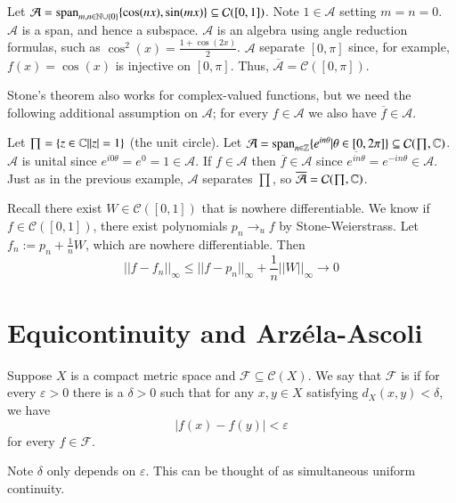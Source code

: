 \begin{example}
    Let $\mathcal{A} = \text{span}_{m,n\in\mathbb N\cup\{0\}}\{\cos(nx),\sin(mx)\} \subseteq \mathcal{C}([0,1])$. Note $1 \in \mathcal{A}$ setting $m = n= 0$. $\mathcal{A}$ is a span, and hence a subspace. $\mathcal{A}$ is an algebra using angle reduction formulas, such as $\cos^2(x) = \frac{1+\cos(2x)}{2}$. $\mathcal{A}$ separate $[0,\pi]$ since, for example, $f(x) = \cos(x)$ is injective on $[0,\pi]$. Thus, $\overline{\mathcal{A}} = \mathcal{C}([0,\pi])$.
\end{example}

Stone's theorem also works for complex-valued functions, but we need the following additional assumption on $\mathcal{A}$; for every $f \in \mathcal{A}$ we also have $\overline{f} \in \mathcal{A}$.

\begin{example}
    Let $\prod = \{z \in \mathbb C\vert |z| = 1\}$ (the unit circle). Let $\mathcal{A} = \text{span}_{n\in\mathbb Z}\{e^{in\theta}\vert\theta \in [0,2\pi]\} \subseteq \mathcal{C}(\prod,\mathbb C)$. $\mathcal{A}$ is unital since $e^{i0\theta} = e^0 = 1 \in \mathcal{A}$. If $f \in \mathcal{A}$ then $\overline{f} \in \mathcal{A}$ since $\overline{e^{in\theta}} = e^{-in\theta} \in \mathcal{A}$. Just as in the previous example, $\mathcal{A}$ separates $\prod$, so $\overline{\mathcal{A}} = \mathcal{C}(\prod,\mathbb C)$.
\end{example}

\begin{example}
    Recall there exist $W \in \mathcal{C}([0,1])$ that is nowhere differentiable. We know if $f \in \mathcal{C}([0,1])$, there exist polynomials $p_n\rightarrow_uf$ by Stone-Weierstrass. Let $f_n := p_n + \frac{1}{n}W$, which are nowhere differentiable. Then $$||f-f_n||_{\infty} \leq ||f-p_n||_{\infty}+\frac{1}{n}||W||_{\infty}\rightarrow 0$$ 
\end{example}



\section{Equicontinuity and Arz\'{e}la-Ascoli}

\begin{definition}[Equicontinuity]
    Suppose $X$ is a compact metric space and $\mathcal{F} \subseteq \mathcal{C}(X)$. We say that $\mathcal{F}$ is  if for every $\varepsilon > 0$ there is a $\delta > 0$ such that for any $x,y \in X$ satisfying $d_X(x,y) < \delta$, we have $$|f(x) - f(y)| < \varepsilon$$ for every $f \in \mathcal{F}$.
\end{definition}
Note $\delta $ only depends on $\varepsilon $. This can be thought of as simultaneous uniform continuity.

